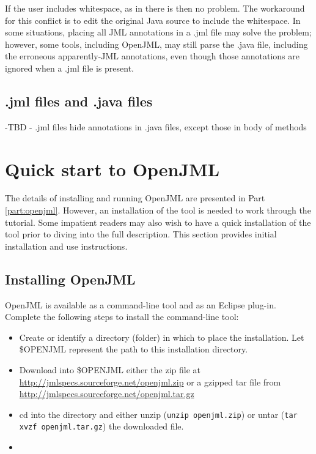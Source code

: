 If the user includes whitespace, as in
there is then no problem. The workaround for this conflict is to edit the original Java source to include the whitespace. In some situations, placing all JML annotations in a .jml file may solve the problem; however, some tools, including OpenJML, may still parse
the .java file, including the erroneous apparently-JML annotations, even though those annotations are ignored when a .jml file is present.

\section{.jml files and .java files}

-TBD - .jml files hide annotations in .java files, except those in body of methods

\chapter{Quick start to OpenJML}

The details of installing and running OpenJML are presented in Part \ref{part:openjml}. However, an installation of the tool is needed to work through the tutorial. Some impatient readers may also wish to have a quick installation of the tool prior to diving into the full description. This section provides initial installation and use instructions.

\section{Installing OpenJML}

OpenJML is available as a command-line tool and as an Eclipse plug-in. Complete the following steps to install the command-line tool:
\begin{itemize}
\item Create or identify a directory (folder) in which to place the installation. Let \$OPENJML represent the path to this installation directory.
\item Download into \$OPENJML either the zip file at \url{http://jmlspecs.sourceforge.net/openjml.zip} or a gzipped tar file from \url{http://jmlspecs.sourceforge.net/openjml.tar.gz}
\item cd into the directory and either unzip (\texttt{unzip openjml.zip}) or untar (\texttt{tar xvzf openjml.tar.gz}) the downloaded file.
\item
\end{itemize}

